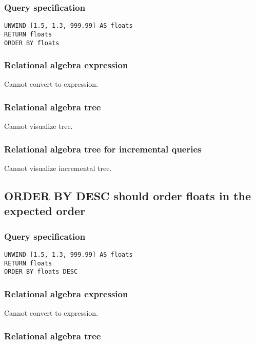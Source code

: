 \subsubsection*{Query specification}

\begin{lstlisting}
UNWIND [1.5, 1.3, 999.99] AS floats
RETURN floats
ORDER BY floats
\end{lstlisting}

\subsubsection*{Relational algebra expression}

Cannot convert to expression.

\subsubsection*{Relational algebra tree}

Cannot visualize tree.

\subsubsection*{Relational algebra tree for incremental queries}

Cannot visualize incremental tree.

\subsection{ORDER BY DESC should order floats in the expected order}

\subsubsection*{Query specification}

\begin{lstlisting}
UNWIND [1.5, 1.3, 999.99] AS floats
RETURN floats
ORDER BY floats DESC
\end{lstlisting}

\subsubsection*{Relational algebra expression}

Cannot convert to expression.

\subsubsection*{Relational algebra tree}

